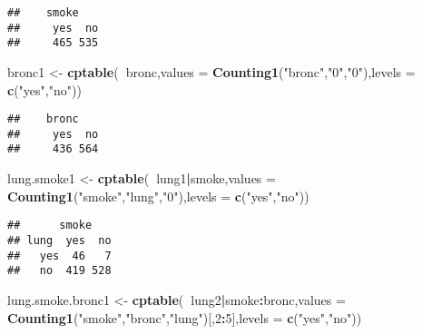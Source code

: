 \documentclass[
]{article}
\newenvironment{Shaded}{\begin{snugshade}}{\end{snugshade}}
\newcommand{\DataTypeTok}[1]{\textcolor[rgb]{0.13,0.29,0.53}{#1}}
\newcommand{\DecValTok}[1]{\textcolor[rgb]{0.00,0.00,0.81}{#1}}
\newcommand{\KeywordTok}[1]{\textcolor[rgb]{0.13,0.29,0.53}{\textbf{#1}}}
\newcommand{\NormalTok}[1]{#1}
\newcommand{\OperatorTok}[1]{\textcolor[rgb]{0.81,0.36,0.00}{\textbf{#1}}}
\newcommand{\StringTok}[1]{\textcolor[rgb]{0.31,0.60,0.02}{#1}}
\begin{document}
\begin{verbatim}
##    smoke
##     yes  no
##     465 535
\end{verbatim}

\begin{Shaded}
\begin{Highlighting}[]
\NormalTok{bronc1 <-}\StringTok{ }\KeywordTok{cptable}\NormalTok{(}\OperatorTok{~}\NormalTok{bronc,}\DataTypeTok{values =} \KeywordTok{Counting1}\NormalTok{(}\StringTok{"bronc"}\NormalTok{,}\StringTok{"0"}\NormalTok{,}\StringTok{"0"}\NormalTok{),}\DataTypeTok{levels =} \KeywordTok{c}\NormalTok{(}\StringTok{"yes"}\NormalTok{,}\StringTok{"no"}\NormalTok{))}
\end{Highlighting}
\end{Shaded}

\begin{verbatim}
##    bronc
##     yes  no
##     436 564
\end{verbatim}

\begin{Shaded}
\begin{Highlighting}[]
\NormalTok{lung.smoke1 <-}\StringTok{ }\KeywordTok{cptable}\NormalTok{(}\OperatorTok{~}\NormalTok{lung1}\OperatorTok{|}\NormalTok{smoke,}\DataTypeTok{values =} \KeywordTok{Counting1}\NormalTok{(}\StringTok{"smoke"}\NormalTok{,}\StringTok{"lung"}\NormalTok{,}\StringTok{"0"}\NormalTok{),}\DataTypeTok{levels =} \KeywordTok{c}\NormalTok{(}\StringTok{"yes"}\NormalTok{,}\StringTok{"no"}\NormalTok{))}
\end{Highlighting}
\end{Shaded}

\begin{verbatim}
##      smoke
## lung  yes  no
##   yes  46   7
##   no  419 528
\end{verbatim}

\begin{Shaded}
\begin{Highlighting}[]
\NormalTok{lung.smoke.bronc1 <-}\StringTok{ }\KeywordTok{cptable}\NormalTok{(}\OperatorTok{~}\NormalTok{lung2}\OperatorTok{|}\NormalTok{smoke}\OperatorTok{:}\NormalTok{bronc,}\DataTypeTok{values =} \KeywordTok{Counting1}\NormalTok{(}\StringTok{"smoke"}\NormalTok{,}\StringTok{"bronc"}\NormalTok{,}\StringTok{"lung"}\NormalTok{)[,}\DecValTok{2}\OperatorTok{:}\DecValTok{5}\NormalTok{],}\DataTypeTok{levels =} \KeywordTok{c}\NormalTok{(}\StringTok{"yes"}\NormalTok{,}\StringTok{"no"}\NormalTok{))}
\end{Highlighting}
\end{Shaded}
\end{document}
